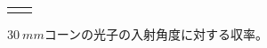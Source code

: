 \begin{figure}[htbp]
\begin{tabular}{cc}
\begin{minipage}[t]{0.45\hsize}
      \caption{$\SI{30}{mm}$コーンの光子の入射角度に対する収率。}
      \label{fig:cone30_optimize2}
    \end{minipage}
  \end{tabular}
\end{figure}
